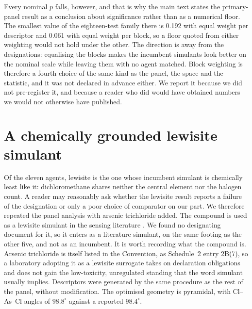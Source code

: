 \documentclass[journal=jacsat,manuscript=suppinfo,margin=1in]{achemso}
\begin{document}
Every nominal $p$ falls, however, and that is why the main text states the
primary-panel result as a conclusion about significance rather than as a
numerical floor. The smallest value of the eighteen-test family there is 0.192
with equal weight per descriptor and 0.061 with equal weight per block, so a
floor quoted from either weighting would not hold under the other. The direction
is away from the designations: equalising the blocks makes the incumbent
simulants look better on the nominal scale while leaving them with no agent
matched. Block weighting is therefore a fourth choice of the same kind as the
panel, the space and the statistic, and it was not declared in advance either.
We report it because we did not pre-register it, and because a reader who did
would have obtained numbers we would not otherwise have published.

\section{A chemically grounded lewisite simulant}
\label{sec:si-ascl3}

\begin{sloppypar}
Of the eleven agents, lewisite is the one whose incumbent simulant is
chemically least like it: dichloromethane shares neither the central element
nor the halogen count. A reader may reasonably ask whether the lewisite result
reports a failure of the designation or only a poor choice of comparator on
our part. We therefore repeated the panel analysis with arsenic trichloride
added. The compound is used as a lewisite simulant in the sensing
literature \cite{lee2016lewisite}. We found no designating document for it,
so it enters as a literature simulant, on the same footing as the other
five, and not as an incumbent.
It is worth recording what the compound is. Arsenic trichloride is itself
listed in the Convention, as Schedule~2 entry 2B(7),\cite{opcwschedules} so a
laboratory adopting it as a lewisite surrogate takes on declaration obligations
and does not gain the low-toxicity, unregulated standing that the word
simulant usually implies. Descriptors were generated by the same procedure as the
rest of the panel, without modification. The optimised geometry is pyramidal,
with Cl--As--Cl angles of $98.8^\circ$ against a reported $98.4^\circ$.
\end{sloppypar}
\end{document}
